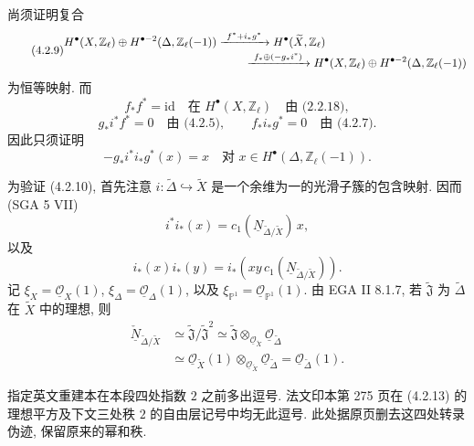 尚须证明复合
\begin{equation}\tag{4.2.9}
\begin{aligned}
&H^\bullet(X,\mathbb Z_\ell)\oplus
 H^{\bullet-2}(\Delta,\mathbb Z_\ell(-1))
 \xrightarrow{\ f^*+i_*g^*\ }
 H^\bullet(\widetilde X,\mathbb Z_\ell)\\[-2pt]
&\hspace{55mm}\xrightarrow{\ f_*\oplus(-g_*i^*)\ }
 H^\bullet(X,\mathbb Z_\ell)\oplus
 H^{\bullet-2}(\Delta,\mathbb Z_\ell(-1))
\end{aligned}
\end{equation}
为恒等映射. 而
\[
f_*f^*=\mathrm{id}\quad\text{在 }H^\bullet(X,\mathbb Z_\ell)
\quad\text{由 (2.2.18)},
\]
\[
g_*i^*f^*=0\quad\text{由 (4.2.5)},
\qquad
f_*i_*g^*=0\quad\text{由 (4.2.7)}.
\]
因此只须证明
\begin{equation}\tag{4.2.10}
-g_*i^*i_*g^*(x)=x
\quad\text{对 }x\in H^\bullet(\Delta,\mathbb Z_\ell(-1)).
\end{equation}

为验证 (4.2.10), 首先注意 $i:\widetilde\Delta\hookrightarrow\widetilde X$ 是一个余维为一的光滑子簇的包含映射. 因而 (SGA 5 VII)
\begin{equation}\tag{4.2.11}
i^*i_*(x)=c_1(\underline N_{\widetilde\Delta/\widetilde X})\,x,
\end{equation}
以及
\begin{equation}\tag{4.2.12}
i_*(x)i_*(y)
=i_*\!\left(xy\,c_1(\underline N_{\widetilde\Delta/\widetilde X})\right).
\end{equation}
记
$\xi_X=\underline{\mathcal O}_X(1)$,
$\xi_\Delta=\underline{\mathcal O}_\Delta(1)$, 以及
$\xi_{\mathbb P^1}=\underline{\mathcal O}_{\mathbb P^1}(1)$.
由 EGA II 8.1.7, 若 $\widetilde{\mathfrak J}$ 为 $\widetilde\Delta$ 在 $\widetilde X$ 中的理想, 则
\begin{equation}\tag{4.2.13}
\begin{aligned}
\underline{\check N}_{\widetilde\Delta/\widetilde X}
&\simeq\widetilde{\mathfrak J}/\widetilde{\mathfrak J}^{2}
 \simeq\widetilde{\mathfrak J}
       \otimes_{\underline{\mathcal O}_{\widetilde X}}
       \underline{\mathcal O}_{\widetilde\Delta}\\
&\simeq\underline{\mathcal O}_{\widetilde X}(1)
       \otimes_{\underline{\mathcal O}_{\widetilde X}}
       \underline{\mathcal O}_{\widetilde\Delta}
 =\underline{\mathcal O}_{\widetilde\Delta}(1).
\end{aligned}
\end{equation}
\begin{editorialnote}
指定英文重建本在本段四处指数 $2$ 之前多出逗号. 法文印本第 275 页在 (4.2.13) 的理想平方及下文三处秩 $2$ 的自由层记号中均无此逗号. 此处据原页删去这四处转录伪迹, 保留原来的幂和秩.
\end{editorialnote}

